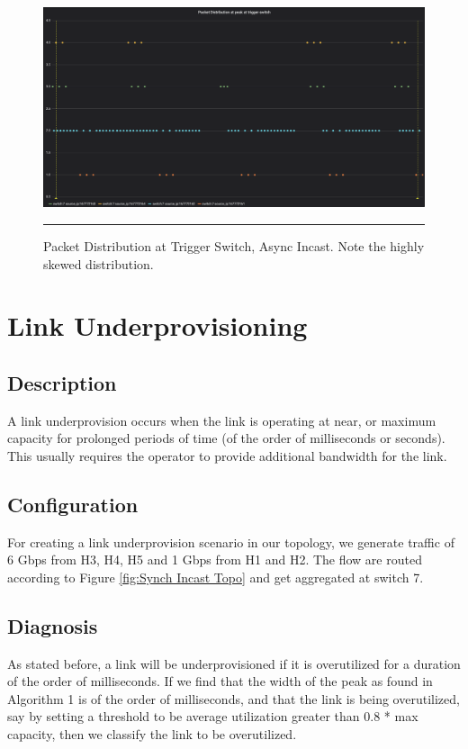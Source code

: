 \begin{figure}[htbp]
	\centering
		\includegraphics[width=1.0\columnwidth]{Figures/distribution_async.png}
		\rule{35em}{0.5pt}
	\caption[Packet Distribution at Trigger Switch, Async Incast]{Packet Distribution at Trigger Switch, Async Incast. Note the highly skewed distribution.}
	\label{fig:distribution_async}
\end{figure}


\section{Link Underprovisioning}
\subsection{Description}
A link underprovision occurs when the link is operating at near, or maximum capacity for prolonged periods of time (of the order of milliseconds or seconds).
This usually requires the operator to provide additional bandwidth for the link.
\subsection{Configuration}
For creating a link underprovision scenario in our topology, we generate traffic of 6 Gbps from H3, H4, H5 and 1 Gbps from H1 and H2. The flow are routed
according to Figure \ref{fig:Synch Incast Topo} and get aggregated at switch 7.
\subsection{Diagnosis}
As stated before, a link will be underprovisioned if it is overutilized for a duration of the order of milliseconds.
If we find that the width of the peak as found in Algorithm 1 is of the order of milliseconds, and that the link is being overutilized, say by setting a threshold
to be average utilization greater than 0.8 * max capacity, then we classify the link to be overutilized.
